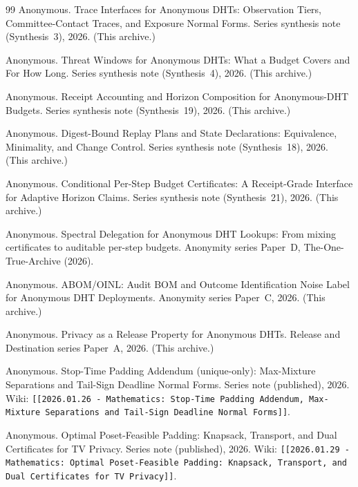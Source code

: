 \documentclass[11pt]{article}
\begin{document}
\begin{thebibliography}{99}
Anonymous.
\newblock Trace Interfaces for Anonymous {DHT}s: Observation Tiers, Committee-Contact Traces, and Exposure Normal Forms.
\newblock Series synthesis note (Synthesis~3), 2026. (This archive.)

Anonymous.
\newblock Threat Windows for Anonymous {DHT}s: What a Budget Covers and For How Long.
\newblock Series synthesis note (Synthesis~4), 2026. (This archive.)

Anonymous.
\newblock Receipt Accounting and Horizon Composition for Anonymous-DHT Budgets.
\newblock Series synthesis note (Synthesis~19), 2026. (This archive.)

Anonymous.
\newblock Digest-Bound Replay Plans and State Declarations: Equivalence, Minimality, and Change Control.
\newblock Series synthesis note (Synthesis~18), 2026. (This archive.)

Anonymous.
\newblock Conditional Per-Step Budget Certificates: A Receipt-Grade Interface for Adaptive Horizon Claims.
\newblock Series synthesis note (Synthesis~21), 2026. (This archive.)

Anonymous.
\newblock Spectral Delegation for Anonymous DHT Lookups: From mixing certificates to auditable per-step budgets.
\newblock Anonymity series Paper~D, The-One-True-Archive (2026).

Anonymous.
\newblock ABOM/OINL: Audit BOM and Outcome Identification Noise Label for Anonymous DHT Deployments.
\newblock Anonymity series Paper~C, 2026. (This archive.)

Anonymous.
\newblock Privacy as a Release Property for Anonymous DHTs.
\newblock Release and Destination series Paper~A, 2026. (This archive.)

Anonymous.
\newblock Stop-Time Padding Addendum (unique-only): Max-Mixture Separations and Tail-Sign Deadline Normal Forms.
\newblock Series note (published), 2026.
\newblock Wiki: \texttt{[[2026.01.26 - Mathematics: Stop-Time Padding Addendum, Max-Mixture Separations and Tail-Sign Deadline Normal Forms]]}.

Anonymous.
\newblock Optimal Poset-Feasible Padding: Knapsack, Transport, and Dual Certificates for TV Privacy.
\newblock Series note (published), 2026.
\newblock Wiki: \texttt{[[2026.01.29 - Mathematics: Optimal Poset-Feasible Padding: Knapsack, Transport, and Dual Certificates for TV Privacy]]}.


\end{thebibliography}
\end{document}
